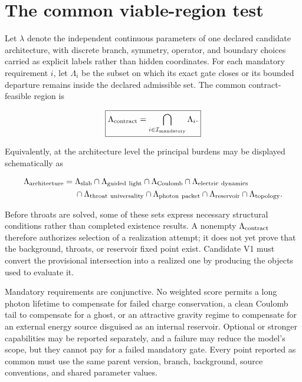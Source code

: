 \section{The common viable-region test}

Let \(\lambda\) denote the independent continuous parameters of one
declared candidate architecture, with discrete branch, symmetry, operator, and
boundary choices carried as explicit labels rather than hidden coordinates. For
each mandatory requirement \(i\), let \(\Lambda_i\) be the subset on which its
exact gate closes or its bounded departure remains inside the declared
admissible set. The common contract-feasible region is

\[
\boxed{
\Lambda_{\rm contract}
=
\bigcap_{i\in\mathcal I_{\rm mandatory}}\Lambda_i.
}
\]

Equivalently, at the architecture level the principal burdens may be displayed
schematically as

\[
\begin{aligned}
\Lambda_{\rm architecture}
={}&
\Lambda_{\rm slab}
\cap\Lambda_{\rm guided\ light}
\cap\Lambda_{\rm Coulomb}
\cap\Lambda_{\rm electric\ dynamics}
\\
&\cap\Lambda_{\rm throat\ universality}
\cap\Lambda_{\rm photon\ packet}
\cap\Lambda_{\rm reservoir}
\cap\Lambda_{\rm topology}.
\end{aligned}
\]

Before throats are solved, some of these sets express necessary structural
conditions rather than completed existence results. A nonempty
\(\Lambda_{\rm contract}\) therefore authorizes selection of a realization
attempt; it does not yet prove that the background, throats, or reservoir fixed
point exist. Candidate V1 must convert the provisional intersection into a
realized one by producing the objects used to evaluate it.

Mandatory requirements are conjunctive. No weighted score permits a long photon
lifetime to compensate for failed charge conservation, a clean Coulomb tail to
compensate for a ghost, or an attractive gravity regime to compensate for an
external energy source disguised as an internal reservoir. Optional or stronger
capabilities may be reported separately, and a failure may reduce the model's
scope, but they cannot pay for a failed mandatory gate. Every point reported as
common must use the same parent version, branch, background, source conventions,
and shared parameter values.

